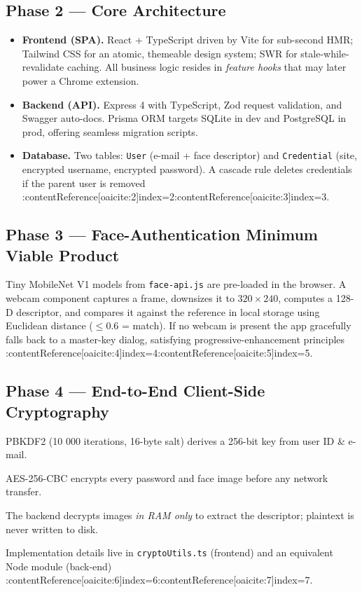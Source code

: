 \subsection{Phase 2 — Core Architecture}
\begin{itemize}
  \item \textbf{Frontend (SPA).}  
        React + TypeScript driven by Vite for sub-second HMR; Tailwind
        CSS for an atomic, themeable design system; SWR for stale-while-
        revalidate caching.  All business logic resides in \emph{feature
        hooks} that may later power a Chrome extension.
  \item \textbf{Backend (API).}  
        Express 4 with TypeScript, Zod request validation, and Swagger
        auto-docs.  Prisma ORM targets SQLite in dev and PostgreSQL in
        prod, offering seamless migration scripts.
  \item \textbf{Database.}  
        Two tables: \texttt{User} (e-mail + face descriptor) and
        \texttt{Credential} (site, encrypted username, encrypted
        password).  A cascade rule deletes credentials if the parent
        user is removed :contentReference[oaicite:2]{index=2}:contentReference[oaicite:3]{index=3}.
\end{itemize}

\subsection{Phase 3 — Face-Authentication Minimum Viable Product}
Tiny MobileNet V1 models from \texttt{face-api.js} are pre-loaded in the
browser.  A webcam component captures a frame, downsizes it to
$320\times240$, computes a 128-D descriptor, and compares it against the
reference in local storage using Euclidean distance ($\le 0.6$ = match).
If no webcam is present the app gracefully falls back to a master-key
dialog, satisfying progressive-enhancement principles
:contentReference[oaicite:4]{index=4}:contentReference[oaicite:5]{index=5}.

\subsection{Phase 4 — End-to-End Client-Side Cryptography}
\begin{enumerate*}
  \item PBKDF2 (10 000 iterations, 16-byte salt) derives a 256-bit key
        from user ID \& e-mail.  
  \item AES-256-CBC encrypts every password and face image before any
        network transfer.  
  \item The backend decrypts images \emph{in RAM only} to extract the
        descriptor; plaintext is never written to disk.  
\end{enumerate*}
Implementation details live in \texttt{cryptoUtils.ts} (frontend) and an
equivalent Node module (back-end) :contentReference[oaicite:6]{index=6}:contentReference[oaicite:7]{index=7}.

